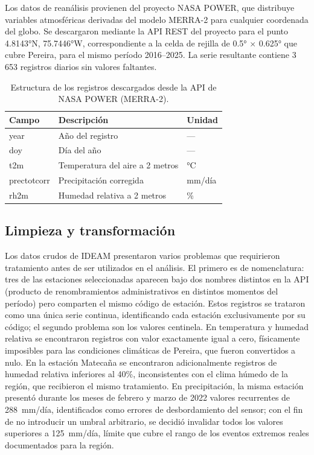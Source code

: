 \documentclass[12pt, a4paper]{article}
\begin{document}
Los datos de reanálisis provienen del proyecto NASA POWER, que distribuye variables
atmosféricas derivadas del modelo MERRA-2 para cualquier coordenada del globo. Se
descargaron mediante la API REST del proyecto para el punto 4.8143°N, 75.7446°W,
correspondiente a la celda de rejilla de 0.5° $\times$ 0.625° que cubre Pereira,
para el mismo período 2016--2025. La serie resultante contiene 3\,653 registros
diarios sin valores faltantes.

\begin{table}[h]
	\centering
	\caption{Estructura de los registros descargados desde la API de NASA POWER (MERRA-2).}
	\label{tab:estructura_nasa}
	\begin{tabular}{lll}
		\toprule
		Campo & Descripción & Unidad \\
		\midrule
		year        & Año del registro                          & --- \\
		doy         & Día del año                               & --- \\
		t2m         & Temperatura del aire a 2 metros           & °C \\
		prectotcorr & Precipitación corregida                   & mm/día \\
		rh2m        & Humedad relativa a 2 metros               & \% \\
		\bottomrule
	\end{tabular}
\end{table}

\subsection{Limpieza y transformación}

Los datos crudos de IDEAM presentaron varios problemas que requirieron tratamiento
antes de ser utilizados en el análisis. El primero es de nomenclatura: tres de las
estaciones seleccionadas aparecen bajo dos nombres distintos en la API (producto
de renombramientos administrativos en distintos momentos del período) pero comparten
el mismo código de estación. Estos registros se trataron como una única serie continua,
identificando cada estación exclusivamente por su código; el segundo problema son los valores centinela. En temperatura y humedad relativa se
encontraron registros con valor exactamente igual a cero, físicamente imposibles para
las condiciones climáticas de Pereira, que fueron convertidos a nulo. En la estación
Matecaña se encontraron adicionalmente registros de humedad relativa inferiores al
40\%, inconsistentes con el clima húmedo de la región, que recibieron el mismo
tratamiento. En precipitación, la misma estación presentó durante los meses de febrero
y marzo de 2022 valores recurrentes de 288~mm/día, identificados como errores de
desbordamiento del sensor; con el fin de no introducir un umbral arbitrario, se
decidió invalidar todos los valores superiores a 125~mm/día, límite que cubre el
rango de los eventos extremos reales documentados para la región.
\end{document}
